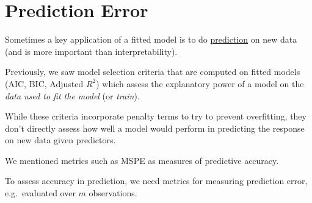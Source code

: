 \section{Prediction Error}
Sometimes a key application of a fitted model
is to do \underline{prediction} on new data
(and is more important than interpretability).

Previously, we saw model selection criteria
that are computed on fitted models
(AIC, BIC, Adjusted $ R^2 $) which assess
the explanatory
power of a model on the \emph{data used to fit the model}
(or \emph{train}).

While these criteria incorporate penalty terms to try
to prevent overfitting, they don't directly assess
how well a model would perform in predicting the response
on new data given predictors.

We mentioned metrics such as MSPE as measures of predictive
accuracy.

To assess accuracy in prediction, we need metrics for
measuring prediction error, e.g.\ evaluated
over $ m $ observations.

